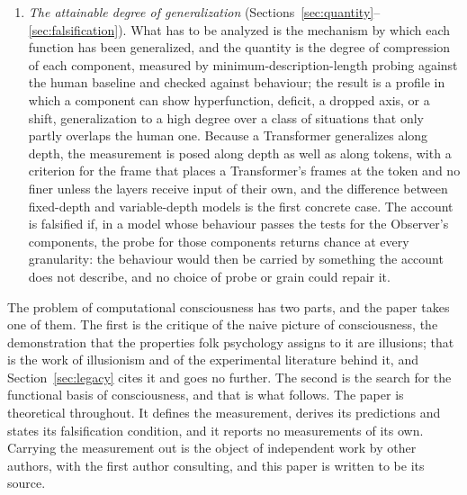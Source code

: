 \begin{enumerate}
  never named, and a next-symbol predictor induces the unnamed part because to generalize is to
  compress. Its state across time is symbolic and lives in the context, its vector state lives below
  the token, its frame is one token, and the high-level functions are not localized in it, as they are
  not in a brain.
\item \emph{The attainable degree of generalization} (Sections~\ref{sec:quantity}--\ref{sec:falsification}).
  What has to be analyzed is the mechanism by which each function has been generalized, and the
  quantity is the degree of compression of each component, measured by minimum-description-length
  probing against the human baseline and checked against behaviour; the result is a profile in which a
  component can show hyperfunction, deficit, a dropped axis, or a shift, generalization to a high
  degree over a class of situations that only partly overlaps the human one. Because a Transformer generalizes along
  depth, the measurement is posed along depth as well as along tokens, with a criterion for the frame that places
  a Transformer's frames at the token and no finer unless the layers receive input of their own, and the difference between fixed-depth and variable-depth
  models is the first concrete case. The account is falsified if, in a model whose
  behaviour passes the tests for the Observer's components, the probe for those components returns
  chance at every granularity: the behaviour would then be carried by something the account does not
  describe, and no choice of probe or grain could repair it.
\end{enumerate}

The problem of computational consciousness has two parts, and the paper takes one of them. The first
is the critique of the naive picture of consciousness, the demonstration that the properties folk
psychology assigns to it are illusions; that is the work of illusionism and of the experimental
literature behind it, and Section~\ref{sec:legacy} cites it and goes no further. The second is the
search for the functional basis of consciousness, and that is what follows. The paper is theoretical
throughout. It defines the measurement, derives its predictions and states its falsification
condition, and it reports no measurements of its own. Carrying the measurement out is the
object of independent work by other authors, with the first author consulting, and this paper is written
to be its source.

